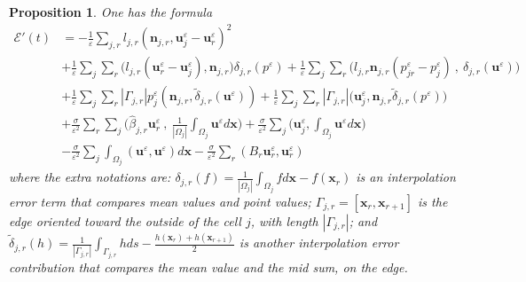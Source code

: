 \documentclass[a4paper,french,english,10pt]{article}
\newcommand\uu{\mathbf{u}}
\newcommand\eps{\varepsilon}
\newcommand\x{\mathbf{x}}
\newtheorem{pro}[theorem]{Proposition}
\begin{document}
\begin{pro} \label{pro:conv1}
One has the formula
\begin{equation} \label{eq:ee1}
\begin{aligned}
\mathscr{E}'(t) &=
-\frac{1}{\eps}\sum_{j,r}l_{j,r}(\mathbf{n}_{j,r},\mathbf{u}_j^{\eps}-\mathbf{u}
_r^{\eps})^2 \\
&+ \frac{1}{\eps} \sum_j \sum_r \bigg(
l_{j,r}(\mathbf{u}_r^{\eps}-\mathbf{u}_j^{\eps}),\mathbf{n}_{j,r} \bigg)
\delta_{j,r}(p^{\eps}) +\frac{1}{\eps} \sum_j \sum_r \bigg( 
 l_{j,r}\mathbf{n}_{j,r} ( p_{jr}^{\eps}  - p_j^{\eps}) \: , \:
\delta_{j,r}(\uu^{\eps}) \bigg) \\
&+\frac{1}{\eps}\sum_j \sum_r  |\Gamma_{j,r} | p_j^{\eps} (\mathbf{n}_{j,r} ,
\tilde{\delta}_{j,r}(\uu^{\eps}) ) + \frac{1}{\eps}\sum_j \sum_r |\Gamma_{j,r} | \bigg(
\mathbf{u}_j^{\eps} , \mathbf{n}_{j,r} \tilde{\delta}_{j,r}(p^{\eps}) \bigg) \\
&+\frac{\sigma}{\eps^2} \sum_r \sum_j 
\bigg(\widehat{\beta}_{j,r}\mathbf{u}_r^{\eps}  \: , \:
\frac{1}{|\Omega_j|}\int_{\Omega_j} \uu^{\eps} d\x \bigg)
+\frac{\sigma}{\eps^2}\sum_j\bigg(  \mathbf{u}_j^{\eps} ,
\int_{\Omega_j}\uu^{\eps}d\x \bigg) \\
&-\frac{\sigma}{\eps^2}\sum_j\int_{\Omega_j}(\uu^{\eps},\uu^{\eps}
)d\x -\frac{\sigma}{\eps^2}\sum_{r}
(B_{r}\mathbf{u}_r^{\eps},\textbf{u}_r^{\eps})
\end{aligned}
\end{equation}
where  the extra notations are:
$\delta_{j,r}(f)= \frac{1}{|\Omega_j|}\int_{\Omega_j} f d\x
-f(\x_{r})$ is an interpolation error term that compares mean values and point 
values;
$\Gamma_{j,r}=[\x_{r},\x_{r+1}]$ is the edge
oriented toward the outside of the cell $j$, with
length $|\Gamma_{j,r} | $; and $\tilde{\delta}_{j,r}(h)=
\frac1{|\Gamma_{j,r}| } \int_{\Gamma_{j,r}} h d s
-\frac{h(\textbf{x}_{r})+h(\textbf{x}_{r+1})}{2}$ is another
interpolation error contribution that compares the  mean value and the mid sum,
on the edge.
\end{pro}
\end{document}
